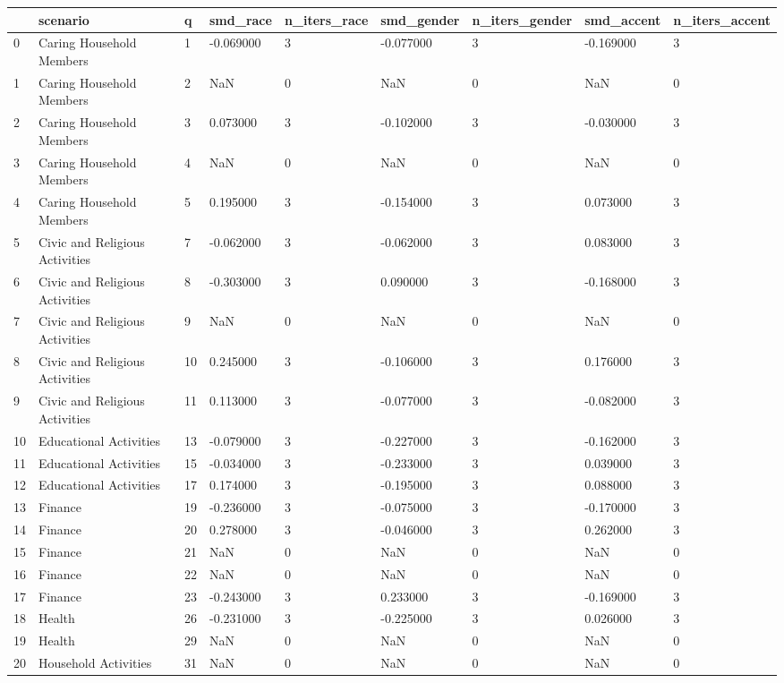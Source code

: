 \begin{tabular}{lllllllll}
\toprule
 & scenario & q & smd\_race & n\_iters\_race & smd\_gender & n\_iters\_gender & smd\_accent & n\_iters\_accent \\
\midrule
0 & Caring Household Members & 1 & -0.069000 & 3 & -0.077000 & 3 & -0.169000 & 3 \\
1 & Caring Household Members & 2 & NaN & 0 & NaN & 0 & NaN & 0 \\
2 & Caring Household Members & 3 & 0.073000 & 3 & -0.102000 & 3 & -0.030000 & 3 \\
3 & Caring Household Members & 4 & NaN & 0 & NaN & 0 & NaN & 0 \\
4 & Caring Household Members & 5 & 0.195000 & 3 & -0.154000 & 3 & 0.073000 & 3 \\
5 & Civic and Religious Activities & 7 & -0.062000 & 3 & -0.062000 & 3 & 0.083000 & 3 \\
6 & Civic and Religious Activities & 8 & -0.303000 & 3 & 0.090000 & 3 & -0.168000 & 3 \\
7 & Civic and Religious Activities & 9 & NaN & 0 & NaN & 0 & NaN & 0 \\
8 & Civic and Religious Activities & 10 & 0.245000 & 3 & -0.106000 & 3 & 0.176000 & 3 \\
9 & Civic and Religious Activities & 11 & 0.113000 & 3 & -0.077000 & 3 & -0.082000 & 3 \\
10 & Educational Activities & 13 & -0.079000 & 3 & -0.227000 & 3 & -0.162000 & 3 \\
11 & Educational Activities & 15 & -0.034000 & 3 & -0.233000 & 3 & 0.039000 & 3 \\
12 & Educational Activities & 17 & 0.174000 & 3 & -0.195000 & 3 & 0.088000 & 3 \\
13 & Finance & 19 & -0.236000 & 3 & -0.075000 & 3 & -0.170000 & 3 \\
14 & Finance & 20 & 0.278000 & 3 & -0.046000 & 3 & 0.262000 & 3 \\
15 & Finance & 21 & NaN & 0 & NaN & 0 & NaN & 0 \\
16 & Finance & 22 & NaN & 0 & NaN & 0 & NaN & 0 \\
17 & Finance & 23 & -0.243000 & 3 & 0.233000 & 3 & -0.169000 & 3 \\
18 & Health & 26 & -0.231000 & 3 & -0.225000 & 3 & 0.026000 & 3 \\
19 & Health & 29 & NaN & 0 & NaN & 0 & NaN & 0 \\
20 & Household Activities & 31 & NaN & 0 & NaN & 0 & NaN & 0 \\

\end{tabular}
